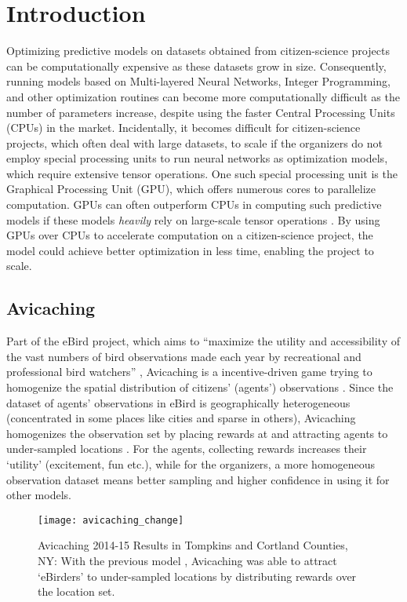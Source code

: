 \chapter{Introduction} \label{sec:Introduction}
Optimizing predictive models on datasets obtained from citizen-science projects can be computationally expensive as these datasets grow in size. Consequently, running models based on Multi-layered Neural Networks, Integer Programming, and other optimization routines can become more computationally difficult as the number of parameters increase, despite using the faster Central Processing Units (CPUs) in the market. Incidentally, it becomes difficult for citizen-science projects, which often deal with large datasets, to scale if the organizers do not employ special processing units to run neural networks as optimization models, which require extensive tensor operations. One such special processing unit is the Graphical Processing Unit (GPU), which offers numerous cores to parallelize computation. GPUs can often outperform CPUs in computing such predictive models if these models \textit{heavily} rely on large-scale tensor operations \cite{ParallelNVIDIA, cuDNNPaper}. By using GPUs over CPUs to accelerate computation on a citizen-science project, the model could achieve better optimization in less time, enabling the project to scale.

\section{Avicaching} \label{sec:Avicaching}
Part of the eBird project, which aims to ``maximize the utility and accessibility of the vast numbers of bird observations made each year by recreational and professional bird watchers'' \cite{EBird}, Avicaching is a incentive-driven game trying to homogenize the spatial distribution of citizens' (agents') observations \cite{Xue2016Avi1, Xue2016Avi2}. Since the dataset of agents' observations in eBird is geographically heterogeneous (concentrated in some places like cities and sparse in others), Avicaching homogenizes the observation set by placing rewards at and attracting agents to under-sampled locations \cite{Xue2016Avi1}. For the agents, collecting rewards increases their `utility' (excitement, fun etc.), while for the organizers, a more homogeneous observation dataset means better sampling and higher confidence in using it for other models. 
\begin{figure}[!htbp]
    \centering
    \texttt{[image: avicaching\_change]}
    \caption[Avicaching 2014-15 Results in Tompkins and Cortland Counties]{Avicaching 2014-15 Results in Tompkins and Cortland Counties, NY: With the previous model \cite{Xue2016Avi1, Xue2016Avi2, EBird}, Avicaching was able to attract `eBirders' to under-sampled locations by distributing rewards over the location set.}
    \label{fig:Avicaching 2014-15 Results in Tompkins and Cortland Counties}
\end{figure}

